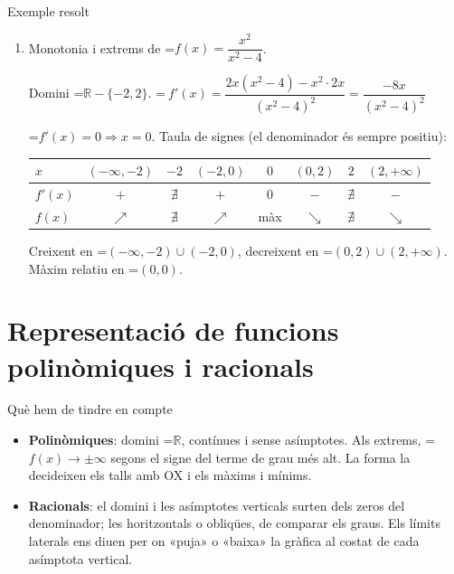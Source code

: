 \documentclass[11pt,a4paper]{article}
\newcommand{\fmm}[1]{\setbox0=\hbox{$#1$}\ifdim\wd0>\linewidth\[#1\]\else\mbox{\box0}\fi}
\begin{document}
  
\begin{fmex}{Exemple resolt}
\begin{enumerate}[label=\textbf{\arabic*.},leftmargin=*]
\item Monotonia i extrems de \fmm{f(x)=\dfrac{x^2}{x^2-4}}.
          

            

Domini \fmm{\mathbb R-\{-2,2\}}. \fmm{\ f'(x)=\dfrac{2x(x^2-4)-x^2\cdot2x}{(x^2-4)^2}=\dfrac{-8x}{(x^2-4)^2}}

            

\fmm{f'(x)=0\Rightarrow x=0}. Taula de signes (el denominador és sempre positiu):

              
\begin{center}\small\renewcommand{\arraystretch}{1.6}\begin{tabular}{l|ccccccc}\toprule
\textbf{$x$} & $(-\infty,-2)$ & \cellcolor{fmsurface}$-2$ & $(-2,0)$ & \cellcolor{fmsurface}$0$ & $(0,2)$ & \cellcolor{fmsurface}$2$ & $(2,+\infty)$\\\midrule
\textbf{$f'(x)$} & \textbf{\color{fmok}$+$} & \cellcolor{fmsurface}$\nexists$ & \textbf{\color{fmok}$+$} & \cellcolor{fmsurface}0 & \textbf{\color{fmas}$-$} & \cellcolor{fmsurface}$\nexists$ & \textbf{\color{fmas}$-$}\\\midrule
\textbf{$f(x)$} & {\Large\color{fmok}$\nearrow$} & \cellcolor{fmsurface}$\nexists$ & {\Large\color{fmok}$\nearrow$} & \cellcolor{fmsurface}màx & {\Large\color{fmas}$\searrow$} & \cellcolor{fmsurface}$\nexists$ & {\Large\color{fmas}$\searrow$}\\
\bottomrule\end{tabular}\end{center}

            

Creixent en \fmm{(-\infty,-2)\cup(-2,0)}, decreixent en \fmm{(0,2)\cup(2,+\infty)}. Màxim relatiu en \fmm{(0,0)}.
\end{enumerate}
\end{fmex}

  
\section{Representació de funcions polinòmiques i racionals}\hypertarget{sec7}{}

  

  
\begin{fmprop}{Què hem de tindre en compte}
\begin{itemize}
\item \textbf{Polinòmiques}: domini \fmm{\mathbb R}, contínues i sense asímptotes. Als extrems, \fmm{f(x)\to\pm\infty} segons el signe del terme de grau més alt. La forma la decideixen els talls amb OX i els màxims i mínims.
\item \textbf{Racionals}: el domini i les asímptotes verticals surten dels zeros del denominador; les horitzontals o obliqües, de comparar els graus. Els límits laterals ens diuen per on «puja» o «baixa» la gràfica al costat de cada asímptota vertical.
\end{itemize}
\end{fmprop}
\end{document}
